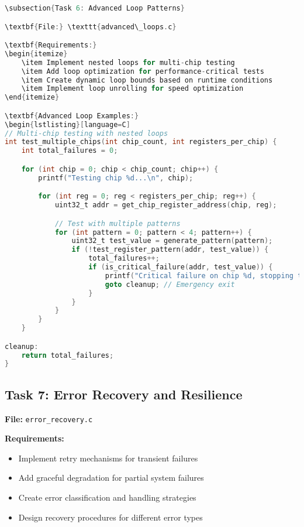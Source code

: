 \documentclass[11pt,a4paper]{article}
\begin{document}
\begin{lstlisting}[language=C]
\subsection{Task 6: Advanced Loop Patterns}

\textbf{File:} \texttt{advanced\_loops.c}

\textbf{Requirements:}
\begin{itemize}
    \item Implement nested loops for multi-chip testing
    \item Add loop optimization for performance-critical tests
    \item Create dynamic loop bounds based on runtime conditions
    \item Implement loop unrolling for speed optimization
\end{itemize}

\textbf{Advanced Loop Examples:}
\begin{lstlisting}[language=C]
// Multi-chip testing with nested loops
int test_multiple_chips(int chip_count, int registers_per_chip) {
    int total_failures = 0;

    for (int chip = 0; chip < chip_count; chip++) {
        printf("Testing chip %d...\n", chip);

        for (int reg = 0; reg < registers_per_chip; reg++) {
            uint32_t addr = get_chip_register_address(chip, reg);

            // Test with multiple patterns
            for (int pattern = 0; pattern < 4; pattern++) {
                uint32_t test_value = generate_pattern(pattern);
                if (!test_register_pattern(addr, test_value)) {
                    total_failures++;
                    if (is_critical_failure(addr, test_value)) {
                        printf("Critical failure on chip %d, stopping tests\n", chip);
                        goto cleanup; // Emergency exit
                    }
                }
            }
        }
    }

cleanup:
    return total_failures;
}
\end{lstlisting}

\subsection{Task 7: Error Recovery and Resilience}

\textbf{File:} \texttt{error\_recovery.c}

\textbf{Requirements:}
\begin{itemize}
    \item Implement retry mechanisms for transient failures
    \item Add graceful degradation for partial system failures
    \item Create error classification and handling strategies
    \item Design recovery procedures for different error types
\end{itemize}
\end{document}
